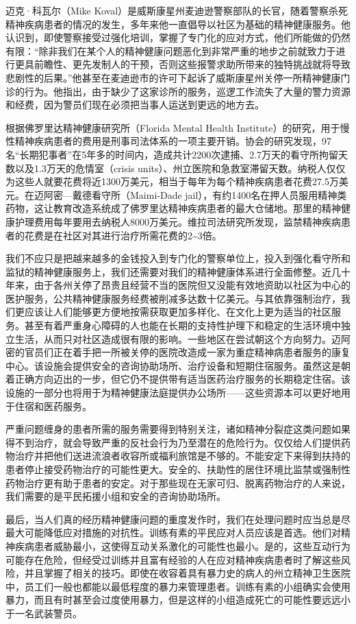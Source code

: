 \documentclass[fontset=fandol, a4paper, 12pt, openright]{ctexbook}
\begin{document}
迈克·科瓦尔（Mike Koval）是威斯康星州麦迪逊警察部队的长官，随着警察杀死精神疾病患者的情况的发生，多年来他一直倡导以社区为基础的精神健康服务。他认识到，即使警察接受过强化培训，掌握了专门化的应对方式，他们所能做的仍然有限：“除非我们在某个人的精神健康问题恶化到非常严重的地步之前就致力于进行更具前瞻性、更先发制人的干预，否则这些报警求助所带来的独特挑战就将导致悲剧性的后果。”他甚至在麦迪逊市的许可下起诉了威斯康星州关停一所精神健康门诊的行为。他指出，由于缺少了这家诊所的服务，巡逻工作流失了大量的警力资源和经费，因为警员们现在必须把当事人运送到更远的地方去。

根据佛罗里达精神健康研究所（Florida Mental Health Institute）的研究，用于慢性精神疾病患者的费用是刑事司法体系的一项主要开销。协会的研究发现，97名“长期犯事者”在5年多的时间内，造成共计2200次逮捕、2.7万天的看守所拘留天数以及1.3万天的危情室（crisis units）、州立医院和急救室滞留天数。纳税人仅仅为这些人就要花费将近1300万美元，相当于每年为每个精神疾病患者花费27.5万美元。在迈阿密—戴德看守所（Maimi-Dade jail），有约1400名在押人员服用精神类药物，这让教育改造系统成了佛罗里达精神疾病患者的最大仓储地。那里的精神健康护理费用每年要用去纳税人8000万美元。维拉司法研究所发现，监禁精神疾病患者的花费是在社区对其进行治疗所需花费的2\textasciitilde3倍。

我们不应只是把越来越多的金钱投入到专门化的警察单位上，投入到强化看守所和监狱的精神健康服务上，我们还需要对我们的精神健康体系进行全面修整。近几十年来，由于各州关停了昂贵且经营不当的医院但又没能有效地资助以社区为中心的医护服务，公共精神健康服务经费被削减多达数十亿美元。与其依靠强制治疗，我们更应该让人们能够更方便地按需获取更加多样化、在文化上更为适当的社区服务。甚至有着严重身心障碍的人也能在长期的支持性护理下和稳定的生活环境中独立生活，从而只对社区造成很有限的影响。一些地区在尝试朝这个方向努力。迈阿密的官员们正在着手把一所被关停的医院改造成一家为重症精神病患者服务的康复中心。该设施会提供安全的咨询协助场所、治疗设备和短期住宿服务。虽然这是朝着正确方向迈出的一步，但它仍不提供带有适当医药治疗服务的长期稳定住宿。该设施的一部分也将用于为精神健康法庭提供办公场所——这些资源本可以更好地用于住宿和医药服务。

严重问题缠身的患者所需的服务需要得到特别关注，诸如精神分裂症这类问题如果得不到治疗，就会导致严重的反社会行为乃至潜在的危险行为。仅仅给人们提供药物治疗并把他们送进流浪者收容所或福利旅馆是不够的。不能安定下来得到扶持的患者停止接受药物治疗的可能性更大。安全的、扶助性的居住环境比监禁或强制性药物治疗更有助于患者的安定。对于那些现在无家可归、脱离药物治疗的人来说，我们需要的是平民拓援小组和安全的咨询协助场所。

最后，当人们真的经历精神健康问题的重度发作时，我们在处理问题时应当总是尽最大可能降低应对措施的对抗性。训练有素的平民应对人员应该是首选。他们对精神疾病患者威胁最小，这使得互动关系激化的可能性也最小。是的，这些互动行为可能存在危险，但经受过训练并且富有经验的人在应对精神疾病患者时了解这些风险，并且掌握了相关的技巧。即使在收容着具有暴力史的病人的州立精神卫生医院中，员工们一般也都能以最低程度的暴力来管理患者。训练有素的小组确实会使用暴力，而且有时甚至会过度使用暴力，但是这样的小组造成死亡的可能性要远远小于一名武装警员。
\end{document}
